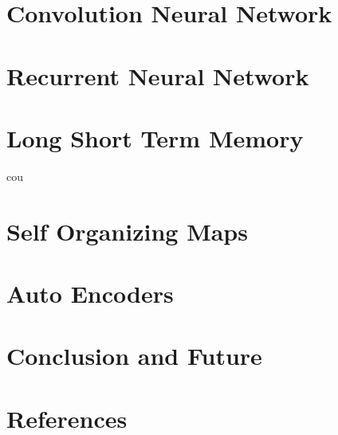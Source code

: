 
\section[CNN]{Convolution Neural Network}


\section[RNN]{Recurrent Neural Network}

\section[LSTM]{Long Short Term Memory}cou


\section[SOM]{Self Organizing Maps}
 
\section[AutoEncoder]{Auto Encoders} 


\section[End]{Conclusion and Future}

\section[Refs]{References}
